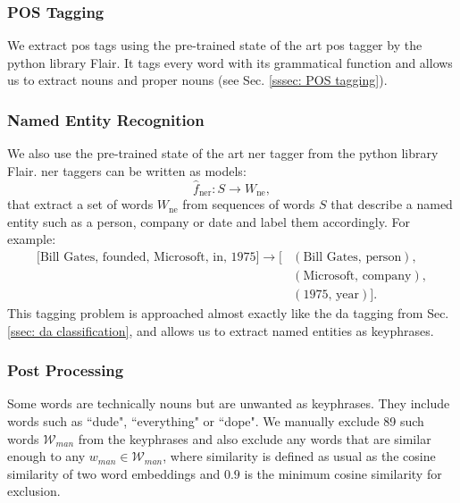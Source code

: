         \subsubsection{POS Tagging}
            We extract \gls{pos} tags using the pre-trained state of the art \gls{pos} tagger by the python library Flair\cite{flairNLP}. It tags every word with its grammatical function and allows us to extract nouns and proper nouns (see Sec. \ref{sssec: POS tagging}).

        \subsubsection{Named Entity Recognition}
            We also use the pre-trained state of the art \gls{ner} tagger from the python library Flair\cite{flairNLP}.
            \Gls{ner} taggers can be written as \glspl{model}:
            \begin{equation}
              \hat{f}_{\text{ner}}: S \rightarrow W_{\text{ne}},
            \end{equation}
            that extract a set of words $W_{\text{ne}}$ from sequences of words $S$ that describe a named entity such as a person, company or date and label them accordingly. For example:
        \begin{align*}
        \text{[Bill Gates, founded, Microsoft, in, 1975]} \rightarrow [& (\text{Bill Gates, person}), \\
                                                                       & (\text{Microsoft, company}), \\
                                                                       & (\text{1975, year})].
        \end{align*}
        This tagging problem is approached almost exactly like the \gls{da} tagging from Sec. \ref{ssec: da classification}, and allows us to extract named entities as \glspl{keyphrase}\cite{flairNLP}.

        \subsubsection{Post Processing}
            Some words are technically nouns but are unwanted as \glspl{keyphrase}. They include words such as ``dude", ``everything" or ``dope". We manually exclude 89 such words $\mathcal{W}_{man}$ from the \glspl{keyphrase} and also exclude any words that are similar enough to any $w_{man} \in \mathcal{W}_{man}$, where similarity is defined as usual as the cosine similarity of two word \glspl{embedding} and $0.9$ is the minimum cosine similarity for exclusion.

